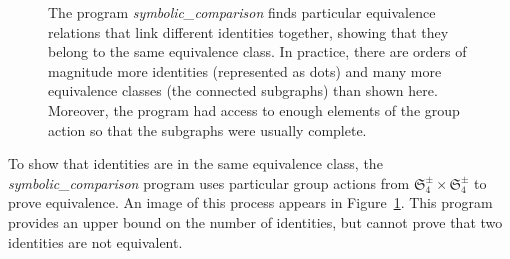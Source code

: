 \documentclass[12pt,table]{article}
\theoremstyle{definition}
\theoremstyle{remark}
\numberwithin{equation}{section}
\begin{document}
\begin{figure}[h]
\begin{center}

\end{center}

\caption{
The program \emph{symbolic\_comparison}
finds particular equivalence relations
that link different identities together,
showing that they belong to the same
equivalence class. In practice,
there are orders of magnitude more
identities (represented as dots) and many more
equivalence classes (the connected subgraphs)
than shown here.
Moreover, the program had access to enough elements
of the group action so that the subgraphs were
usually complete.
}
 
\label{figure_connections}
 
\end{figure}





To show that identities are in the same
equivalence class, the
\emph{symbolic\_comparison}
program
uses particular
group actions from 
$ \mathfrak{S}_4^\pm \times \mathfrak{S}_4^\pm $
to prove equivalence.
An image of this process
appears in 
Figure~\ref{figure_connections}.
This program provides an upper
bound on the number of identities,
but cannot prove that two identities
are not equivalent.
\end{document}
